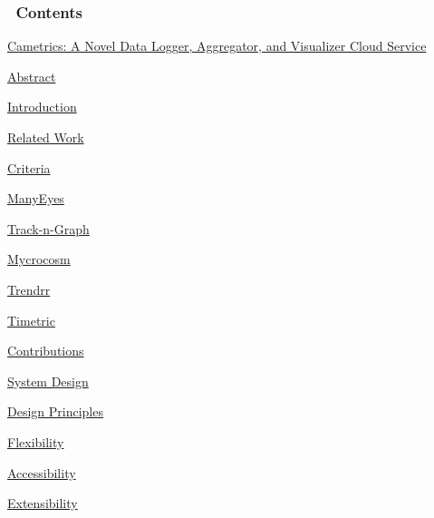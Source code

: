 \documentclass[10pt,a4paper,english]{article}
\begin{document}
\pagebreak{}

\hypertarget{contents}{}
\subsubsection*{~\hfill Contents\hfill ~}
\label{contents}
\begin{list}{}{}
\item {} \href{\#cametrics-a-novel-data-logger-aggregator-and-visualizer-cloud-service}{Cametrics: A Novel Data Logger, Aggregator, and Visualizer Cloud Service}

\item {} \href{\#abstract}{Abstract}

\item {} \href{\#introduction}{Introduction}

\item {} \href{\#related-work}{Related Work}
\begin{list}{}{}
\item {} \href{\#criteria}{Criteria}

\item {} \href{\#manyeyes}{ManyEyes}

\item {} \href{\#track-n-graph}{Track-n-Graph}

\item {} \href{\#mycrocosm}{Mycrocosm}

\item {} \href{\#trendrr}{Trendrr}

\item {} \href{\#timetric}{Timetric}

\end{list}

\item {} \href{\#contributions}{Contributions}

\item {} \href{\#system-design}{System Design}
\begin{list}{}{}
\item {} \href{\#design-principles}{Design Principles}
\begin{list}{}{}
\item {} \href{\#flexibility}{Flexibility}

\item {} \href{\#accessibility}{Accessibility}

\item {} \href{\#extensibility}{Extensibility}


\end{list}
\end{list}
\end{list}
\end{document}

